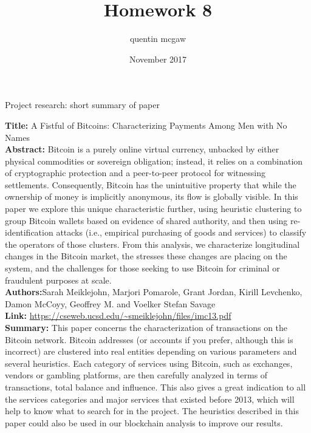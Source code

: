 \documentclass{article}
\title{Homework 8}
\author{quentin mcgaw}
\date{November 2017}
\begin{document}
\maketitle

\begin{center}
    Project research: short summary of paper
\end{center}
\textbf{Title:} A Fistful of Bitcoins: Characterizing Payments Among Men with No Names
\\ \textbf{Abstract:} Bitcoin is a purely online virtual currency, unbacked by either physical commodities or sovereign obligation; instead, it relies on a combination of cryptographic protection and a peer-to-peer protocol for witnessing settlements. Consequently, Bitcoin has the unintuitive property that while the ownership of money is implicitly anonymous, its flow is globally visible. In this paper we explore this unique characteristic further, using heuristic clustering to group Bitcoin wallets based on evidence of shared authority, and then using re-identification attacks (i.e., empirical purchasing of goods and services) to classify the operators of those clusters. From this analysis, we characterize longitudinal changes in the Bitcoin market, the stresses these changes are placing on the system, and the challenges for those seeking to use Bitcoin for criminal or fraudulent purposes at scale.
\\ \textbf{Authors:}Sarah Meiklejohn, Marjori Pomarole, Grant Jordan, Kirill Levchenko, Damon McCoyy, Geoffrey M. and Voelker Stefan Savage
\\ \textbf{Link:} \url{https://cseweb.ucsd.edu/~smeiklejohn/files/imc13.pdf}
\\ \textbf{Summary:} This paper concerns the characterization of transactions on the Bitcoin network. Bitcoin addresses (or accounts if you prefer, although this is incorrect) are clustered into real entities depending on various parameters and several heuristics. Each category of services using Bitcoin, such as exchanges, vendors or gambling platforms, are then carefully analyzed in terms of transactions, total balance and influence. This also gives a great indication to all the services categories and major services that existed before 2013, which will help to know what to search for in the project. The heuristics described in this paper could also be used in our blockchain analysis to improve our results.
\end{document}
